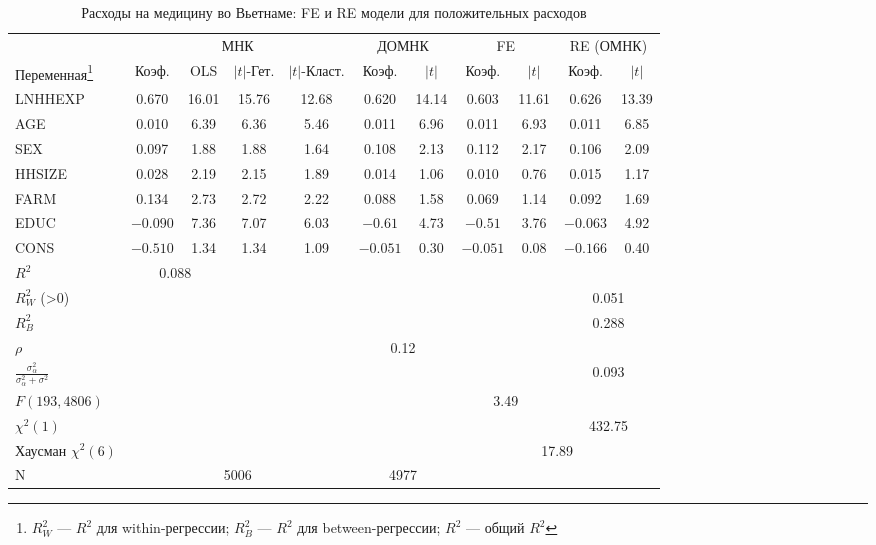 \begin{sidewaystable}[!htbp]
\caption{\label{tab:pred} Расходы на медицину во Вьетнаме: FE и RE модели для положительных расходов}
\begin{minipage}{\textwidth}
\begin{center}
\begin{tabular}{lcccccccccc}
\hline
\hline
& \multicolumn{4}{c}{МНК} & \multicolumn{2}{c}{ДОМНК} & \multicolumn{2}{c}{FE} & \multicolumn{2}{c}{RE (ОМНК)} \\
\cmidrule(r){2-5} \cmidrule(r){6-7} \cmidrule(r){8-9} \cmidrule(r){10-11}
Переменная\footnote{$R^2_W$ --- $R^2$ для within-регрессии; $R^2_B$ --- $R^2$ для between-регрессии; $R^2$ --- общий $R^2$} & Коэф. & OLS & $|t|$-Гет. & $|t|$-Класт. & Коэф. & $|t|$ & Коэф. & $|t|$ & Коэф. & $|t|$ \\
\hline
LNHHEXP & 0.670 & 16.01 & 15.76 & 12.68 & 0.620 & 14.14 & 0.603 & 11.61 & 0.626 & 13.39 \\
AGE & 0.010 & 6.39 & 6.36 & 5.46 & 0.011 & 6.96 & 0.011 & 6.93 & 0.011 & 6.85 \\
SEX & 0.097 & 1.88 & 1.88 & 1.64 & 0.108 & 2.13 & 0.112 & 2.17 & 0.106 & 2.09 \\
HHSIZE & 0.028 & 2.19 & 2.15 & 1.89 & 0.014 & 1.06 & 0.010 & 0.76 & 0.015 & 1.17 \\
FARM & 0.134 & 2.73 & 2.72 & 2.22 & 0.088 & 1.58 & 0.069 & 1.14 & 0.092 & 1.69\\
EDUC & $-0.090$ & 7.36 & 7.07 & 6.03 & $-0.61$ & 4.73 & $-0.51$ & 3.76 & $-0.063$ & 4.92 \\
CONS & $-0.510$ & 1.34 & 1.34 & 1.09 & $-0.051$ & 0.30 & $-0.051$ & 0.08 & $-0.166$ & 0.40 \\
$R^2$ & \multicolumn{2}{c}{0.088} &  &  &  &  &  &  &  &  \\
$R^2_W$ (>0) & \multicolumn{8}{c}{ } & \multicolumn{2}{c}{0.051} \\
$R^2_B$ & \multicolumn{8}{c}{ } & \multicolumn{2}{c}{0.288} \\
$\rho$ & \multicolumn{4}{c}{ } & \multicolumn{2}{c}{0.12} & \multicolumn{4}{c}{ }\\
$\frac{\sigma^2_{\alpha}}{\sigma^2_{\alpha} + \sigma^2}$ & \multicolumn{8}{c}{ } & \multicolumn{2}{c}{0.093}\\
$F(193, 4806)$ & \multicolumn{6}{c}{ } & \multicolumn{2}{c}{3.49} & \multicolumn{2}{c}{ } \\
$\chi^2(1)$ & \multicolumn{8}{c}{ } & \multicolumn{2}{c}{432.75} \\
Хаусман $\chi^2(6)$ & \multicolumn{6}{c}{ } & \multicolumn{4}{c}{17.89} \\
N & \multicolumn{4}{c}{5006} & \multicolumn{2}{c}{4977} & \multicolumn{4}{c}{ } \\
\hline
\hline
\end{tabular}
\end{center}
\end{minipage}
\end{sidewaystable}


